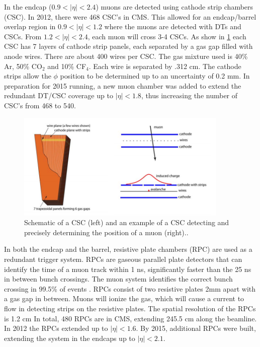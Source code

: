 \documentclass[oneside, letterpaper, oldfontcommands]{memoir}
\begin{document}
\qquad In the endcap ($ 0.9 < |\eta| < 2.4$) muons are detected using cathode strip chambers (CSC). In 2012, there were 468 CSC's in CMS. This allowed for an endcap/barrel overlap region in $0.9 < |\eta| < 1.2$ where the muons are detected with DTs and CSCs. From $1.2 < |\eta| < 2.4$, each muon will cross 3-4 CSCs. As show in \ref{fig:muoncsc} each CSC has 7 layers of cathode strip panels, each separated by a gas gap filled with anode wires. There are about 400 wires per CSC. The gas mixture used is 40\% Ar, 50\% CO$_{2}$ and 10\% CF$_{4}$. Each wire is separated by .312 cm. The cathode strips allow the $\phi$ position to be determined up to an uncertainty of 0.2 mm\cite{Collaboration:1355706}. In preparation for 2015 running, a new muon chamber was added to extend the redundant DT/CSC coverage up to $|\eta| < 1.8$, thus increasing the number of CSC's from 468 to 540. 

\begin{figure}[here]
\includegraphics[width=0.9\textwidth]{muoncsc.png}
\caption{Schematic of a CSC (left) and an example of a CSC detecting and precisely determining the position of a muon (right).\cite{1748-0221-3-08-S08001}.}
\label{fig:muoncsc}
\end{figure}

\qquad In both the endcap and the barrel, resistive plate chambers (RPC) are used as a redundant trigger system. RPCs are gaseous parallel plate detectors that can identify the time of a muon track within 1 ns,  significantly faster than the 25 ns in between bunch crossings. The muon system identifies the correct bunch crossing in 99.5\% of events \cite{Chatrchyan:2013sba}. RPCs consist of two resistive plates 2mm apart with a gas gap in between. Muons will ionize the gas, which will cause a current to flow in detecting strips on the resistive plates. The spatial resolution of the RPCs is 1.2 cm\cite{Chatrchyan:2013sba} In total, 480 RPCs are in CMS, extending 245.5 cm along the beamline. In 2012 the RPCs extended up to $|\eta| < 1.6$. By 2015, additional RPCs were built, extending the system in the endcaps up to $|\eta| < 2.1$.
\end{document}
